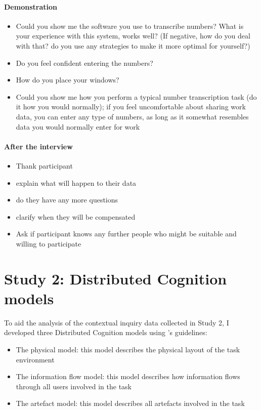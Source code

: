 \subsubsection{Demonstration}
\begin{itemize}
\item Could you show me the software you use to transcribe numbers?
What is your experience with this system, works well?
(If negative, how do you deal with that? do you use any strategies to make it more optimal for yourself?)
\item Do you feel confident entering the numbers?
\item How do you place your windows?
\item Could you show me how you perform a typical number transcription task (do it how you would normally); if you feel uncomfortable about sharing work data, you can enter any type of numbers, as long as it somewhat resembles data you would normally enter for work
\end{itemize}
\subsubsection{After the interview}
\begin{itemize}
\item Thank participant
\item explain what will happen to their data
\item do they have any more questions
\item clarify when they will be compensated
\item Ask if participant knows any further people who might be suitable and willing to participate
\end{itemize}

\chapter{Study 2: Distributed Cognition models}\label{ch:S2_Models}\label{ch:S2_Models}
To aid the analysis of the contextual inquiry data collected in Study 2, I developed three Distributed Cognition models using \citet{Furniss2006}'s guidelines:

\begin{itemize}
\item 
The physical model: this model describes the physical layout of the task environment
\item 
The information flow model: this model describes how information flows through all users involved in the task
\item 
The artefact model: this model describes all artefacts involved in the task
\end{itemize}

